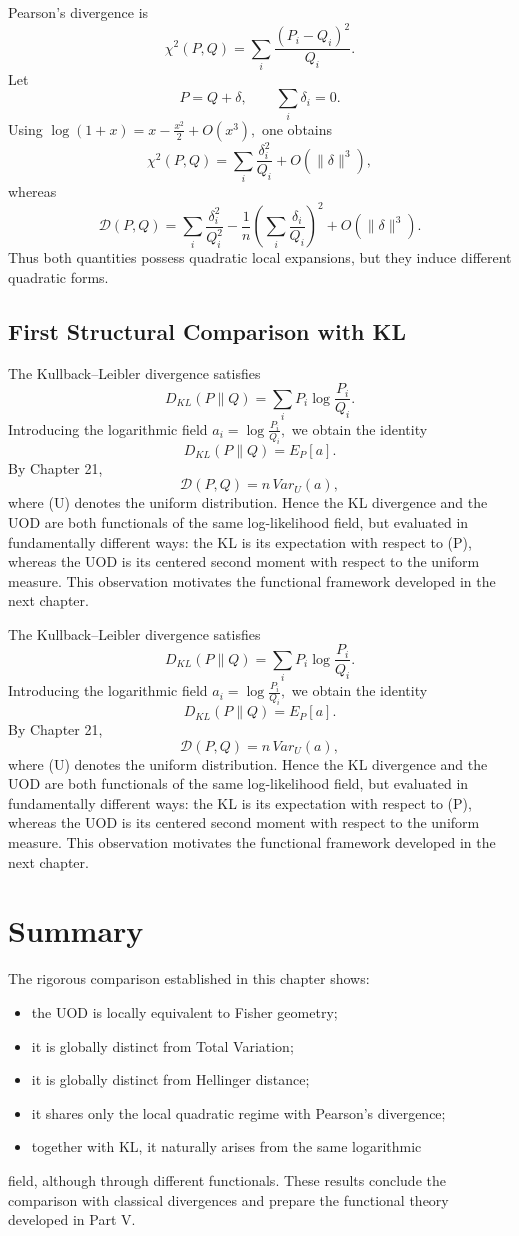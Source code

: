 Pearson's divergence is
\[ \chi^{2}(P,Q) = \sum_{i}
\frac{(P_i-Q_i)^2}{Q_i}. \]
Let
\[ P=Q+\delta, \qquad
\sum_{i}\delta_{i}=0. \]
Using
$\log(1+x)=x-\frac{x^2}{2}+O(x^{3}),$
one obtains
\[ \chi^{2}(P,Q) = \sum_{i}
\frac{\delta_i^2}{Q_i} + O(\|\delta\|^{3}), \]
whereas
\[ \mathcal{D}(P,Q) = \sum_{i}
\frac{\delta_i^2}{Q_i^2} - \frac1n \left(
\sum_{i}\frac{\delta_i}{Q_i} \right)^{2} +
O(\|\delta\|^{3}). \]
Thus both quantities possess quadratic local expansions, but they induce
different quadratic forms.
\subsection{First Structural Comparison with KL}
The Kullback--Leibler divergence satisfies
\[ D_{KL}(P\|Q) = \sum_{i} P_i
\log\frac{P_i}{Q_i}. \]
Introducing the logarithmic field
$a_i=\log\frac{P_i}{Q_i},$
we obtain the identity
\[ \boxed{
D_{KL}(P\|Q)=E_P[a].
} \]
By Chapter 21,
\[ \boxed{
\mathcal{D}(P,Q)
=
n\,Var_U(a),
} \]
where (U) denotes the uniform distribution.
Hence the KL divergence and the UOD are both functionals of the same
log-likelihood field, but evaluated in fundamentally different ways: the
KL is its expectation with respect to (P), whereas the UOD is its
centered second moment with respect to the uniform measure.
This observation motivates the functional framework developed in the
next chapter.


The Kullback--Leibler divergence satisfies
\[ D_{KL}(P\|Q) = \sum_{i} P_i
\log\frac{P_i}{Q_i}. \]
Introducing the logarithmic field
$a_i=\log\frac{P_i}{Q_i},$
we obtain the identity
\[ \boxed{
D_{KL}(P\|Q)=E_P[a].
} \]
By Chapter 21,
\[ \boxed{
\mathcal{D}(P,Q)
=
n\,Var_U(a),
} \]
where (U) denotes the uniform distribution.
Hence the KL divergence and the UOD are both functionals of the same
log-likelihood field, but evaluated in fundamentally different ways: the
KL is its expectation with respect to (P), whereas the UOD is its
centered second moment with respect to the uniform measure.
This observation motivates the functional framework developed in the
next chapter.
\section{Summary}
The rigorous comparison established in this chapter shows:
\begin{itemize}
  \item the UOD is locally equivalent to Fisher geometry;
  \item it is globally distinct from Total Variation;
  \item it is globally distinct from Hellinger distance;
  \item it shares only the local quadratic regime with Pearson's divergence;
  \item together with KL, it naturally arises from the same logarithmic
\end{itemize}
    field, although through different functionals.
These results conclude the comparison with classical divergences and
prepare the functional theory developed in Part V.
